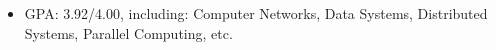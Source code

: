 
\begin{itemize}[nosep]
  \item GPA: 3.92/4.00, including: Computer Networks, Data Systems, Distributed Systems, Parallel Computing, etc.
\end{itemize}
